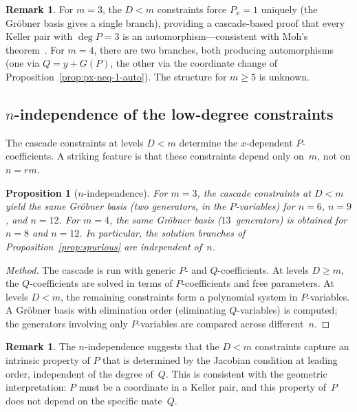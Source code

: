 \documentclass[12pt,a4paper]{article}
\newtheorem{proposition}[theorem]{Proposition}
\theoremstyle{definition}
\newtheorem{remark}[theorem]{Remark}
\begin{document}
\begin{remark}
For $m = 3$, the $D < m$ constraints force $P_x = 1$ uniquely
(the Gr\"obner basis gives a single branch), providing a
cascade-based proof that every Keller pair with $\deg P = 3$ is
an automorphism---consistent with Moh's theorem~\cite{Moh}.
For $m = 4$, there are two branches, both producing automorphisms
(one via $Q = y + G(P)$, the other via the coordinate change of
Proposition~\ref{prop:px-neq-1-auto}).
The structure for $m \geq 5$ is unknown.
\end{remark}

\subsection{\texorpdfstring{$n$}{n}-independence of the low-degree constraints}%
\label{sec:n-independence}

The cascade constraints at levels $D < m$ determine the $x$-dependent
$P$-coefficients. A striking feature is that these constraints depend
only on~$m$, not on $n = rm$.

\begin{proposition}[$n$-independence]\label{prop:n-indep}
For $m = 3$, the cascade constraints at $D < m$ yield the same
Gr\"obner basis (two generators, in the $P$-variables) for
$n = 6$, $n = 9$, and $n = 12$. For $m = 4$, the same Gr\"obner
basis ($13$~generators) is obtained for $n = 8$ and $n = 12$.
In particular, the solution branches of
Proposition~\textup{\ref{prop:spurious}} are independent of~$n$.
\end{proposition}

\begin{proof}[Method]
The cascade is run with generic $P$- and $Q$-coefficients. At levels
$D \geq m$, the $Q$-coefficients are solved in terms of $P$-coefficients
and free parameters. At levels $D < m$, the remaining constraints form
a polynomial system in $P$-variables. A Gr\"obner basis with elimination
order (eliminating $Q$-variables) is computed; the generators involving
only $P$-variables are compared across different~$n$.
\end{proof}

\begin{remark}
The $n$-independence suggests that the $D < m$ constraints capture an
intrinsic property of $P$ that is determined by the Jacobian condition
at leading order, independent of the degree of~$Q$. This is consistent
with the geometric interpretation: $P$ must be a coordinate in a
Keller pair, and this property of~$P$ does not depend on the specific
mate~$Q$.
\end{remark}
\end{document}
